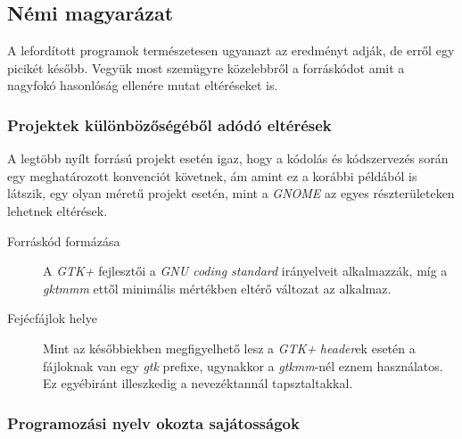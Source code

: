 \subsection{Némi magyarázat}

A lefordított programok természetesen ugyanazt az eredményt adják, de erről egy picikét később. Vegyük most szemügyre közelebbről a forráskódot amit a nagyfokó hasonlóság ellenére mutat eltéréseket is.

\subsubsection{Projektek különbözőségéből adódó eltérések}

A legtöbb nyílt forrású projekt esetén igaz, hogy a kódolás és kódszervezés során egy meghatározott konvenciót követnek, ám amint ez a korábbi példából is látszik, egy olyan méretű projekt esetén, mint a \textit{GNOME} az egyes részterületeken lehetnek eltérések.

\begin{description}
 \item[Forráskód formázása] A \textit{GTK+} fejlesztői a \textit{GNU coding standard} irányelveit alkalmazzák, míg a \textit{gktmmm} ettől minimális mértékben eltérő változat az alkalmaz.

 \item[Fejécfájlok helye] Mint az későbbiekben megfigyelhető lesz a \textit{GTK+} \textit{header}ek esetén a fájloknak van egy \textit{gtk} prefixe, ugynakkor a \textit{gtkmm}-nél eznem használatos. Ez egyébiránt illeszkedig a nevezéktannál tapsztaltakkal.
 \end{description}

\subsubsection{Programozási nyelv okozta sajátosságok}

